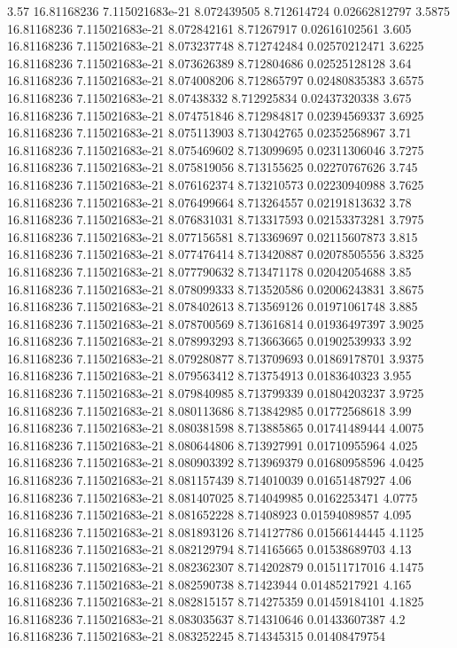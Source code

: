 {3.57 16.81168236 7.115021683e-21 8.072439505 8.712614724 0.02662812797
3.5875 16.81168236 7.115021683e-21 8.072842161 8.71267917 0.02616102561
3.605 16.81168236 7.115021683e-21 8.073237748 8.712742484 0.02570212471
3.6225 16.81168236 7.115021683e-21 8.073626389 8.712804686 0.02525128128
3.64 16.81168236 7.115021683e-21 8.074008206 8.712865797 0.02480835383
3.6575 16.81168236 7.115021683e-21 8.07438332 8.712925834 0.02437320338
3.675 16.81168236 7.115021683e-21 8.074751846 8.712984817 0.02394569337
3.6925 16.81168236 7.115021683e-21 8.075113903 8.713042765 0.02352568967
3.71 16.81168236 7.115021683e-21 8.075469602 8.713099695 0.02311306046
3.7275 16.81168236 7.115021683e-21 8.075819056 8.713155625 0.02270767626
3.745 16.81168236 7.115021683e-21 8.076162374 8.713210573 0.02230940988
3.7625 16.81168236 7.115021683e-21 8.076499664 8.713264557 0.02191813632
3.78 16.81168236 7.115021683e-21 8.076831031 8.713317593 0.02153373281
3.7975 16.81168236 7.115021683e-21 8.077156581 8.713369697 0.02115607873
3.815 16.81168236 7.115021683e-21 8.077476414 8.713420887 0.02078505556
3.8325 16.81168236 7.115021683e-21 8.077790632 8.713471178 0.02042054688
3.85 16.81168236 7.115021683e-21 8.078099333 8.713520586 0.02006243831
3.8675 16.81168236 7.115021683e-21 8.078402613 8.713569126 0.01971061748
3.885 16.81168236 7.115021683e-21 8.078700569 8.713616814 0.01936497397
3.9025 16.81168236 7.115021683e-21 8.078993293 8.713663665 0.01902539933
3.92 16.81168236 7.115021683e-21 8.079280877 8.713709693 0.01869178701
3.9375 16.81168236 7.115021683e-21 8.079563412 8.713754913 0.0183640323
3.955 16.81168236 7.115021683e-21 8.079840985 8.713799339 0.01804203237
3.9725 16.81168236 7.115021683e-21 8.080113686 8.713842985 0.01772568618
3.99 16.81168236 7.115021683e-21 8.080381598 8.713885865 0.01741489444
4.0075 16.81168236 7.115021683e-21 8.080644806 8.713927991 0.01710955964
4.025 16.81168236 7.115021683e-21 8.080903392 8.713969379 0.01680958596
4.0425 16.81168236 7.115021683e-21 8.081157439 8.714010039 0.01651487927
4.06 16.81168236 7.115021683e-21 8.081407025 8.714049985 0.0162253471
4.0775 16.81168236 7.115021683e-21 8.081652228 8.71408923 0.01594089857
4.095 16.81168236 7.115021683e-21 8.081893126 8.714127786 0.01566144445
4.1125 16.81168236 7.115021683e-21 8.082129794 8.714165665 0.01538689703
4.13 16.81168236 7.115021683e-21 8.082362307 8.714202879 0.01511717016
4.1475 16.81168236 7.115021683e-21 8.082590738 8.71423944 0.01485217921
4.165 16.81168236 7.115021683e-21 8.082815157 8.714275359 0.01459184101
4.1825 16.81168236 7.115021683e-21 8.083035637 8.714310646 0.01433607387
4.2 16.81168236 7.115021683e-21 8.083252245 8.714345315 0.01408479754
}
